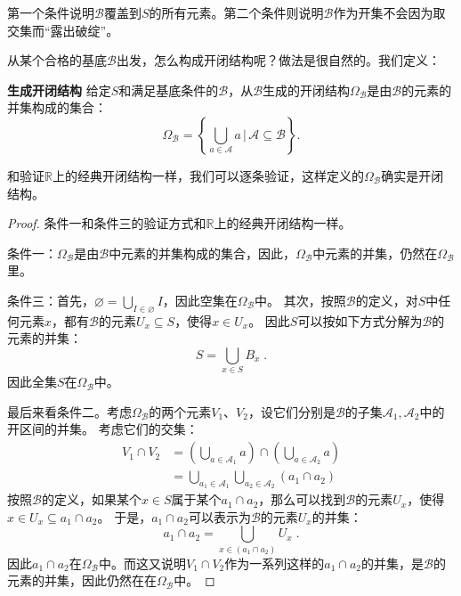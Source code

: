 \documentclass[12pt,UTF8]{ctexbook}
\begin{document}
\begin{appendix}
第一个条件说明$\mathcal{B}$覆盖到$S$的所有元素。第二个条件则说明$\mathcal{B}$作为开集不会因为取交集而“露出破绽”。

从某个合格的基底$\mathcal{B}$出发，怎么构成开闭结构呢？做法是很自然的。我们定义：
\begin{df}{\textbf{生成开闭结构}}
    给定$S$和满足基底条件的$\mathcal{B}$，从$\mathcal{B}$生成的开闭结构$\Omega_{\mathcal{B}}$是由$\mathcal{B}$的元素的并集构成的集合：
    $$ \Omega_{\mathcal{B}} =\left\{\bigcup_{a \in \mathcal{A}} a \, \Bigg| \,\mathcal{A} \subseteq  \mathcal{B} \right\}.  $$
\end{df}

和验证$\mathbb{R}$上的经典开闭结构一样，我们可以逐条验证，这样定义的$\Omega_{\mathcal{B}}$确实是开闭结构。

\begin{proof}
    条件一和条件三的验证方式和$\mathbb{R}$上的经典开闭结构一样。

    条件一：$\Omega_{\mathcal{B}}$是由$\mathcal{B}$中元素的并集构成的集合，因此，$\Omega_{\mathcal{B}}$中元素的并集，仍然在$\Omega_{\mathcal{B}}$里。

    条件三：首先，$\varnothing = \bigcup_{I \in \varnothing} I $，因此空集在$\Omega_{\mathcal{B}}$中。
    其次，按照$\mathcal{B}$的定义，对$S$中任何元素$x$，都有$\mathcal{B}$的元素$U_x\subseteq S$，使得$x\in U_x$。
    因此$S$可以按如下方式分解为$\mathcal{B}$的元素的并集：
    $$ S = \bigcup_{x\in S} B_x \;. $$
    因此全集$S$在$\Omega_{\mathcal{B}}$中。

    最后来看条件二。考虑$\Omega_{\mathcal{B}}$的两个元素$V_1$、$V_2$，设它们分别是$\mathcal{B}$的子集$\mathcal{A}_1, \mathcal{A}_2$中的开区间的并集。
    考虑它们的交集：
    \begin{align*}
        V_1\cap V_2 &= \left(\bigcup_{a \in \mathcal{A}_1} a\right) \cap \left(\bigcup_{a \in \mathcal{A}_2} a\right) \\
        &= \bigcup_{a_1 \in \mathcal{A}_1} \bigcup_{a_2 \in \mathcal{A}_2} (a_1 \cap a_2)   
    \end{align*}
    按照$\mathcal{B}$的定义，如果某个$x\in S$属于某个$a_1 \cap a_2$，那么可以找到$\mathcal{B}$的元素$U_x$，使得$x\in U_x \subseteq a_1\cap a_2$。
    于是，$a_1 \cap a_2$可以表示为$\mathcal{B}$的元素$U_x$的并集：
    $$ a_1 \cap a_2 = \bigcup_{x\in (a_1 \cap a_2)} U_x \;. $$
    因此$a_1 \cap a_2$在$\Omega_{\mathcal{B}}$中。而这又说明$V_1\cap V_2$作为一系列这样的$a_1 \cap a_2$的并集，是$\mathcal{B}$的元素的并集，因此仍然在在$\Omega_{\mathcal{B}}$中。

\end{proof}


\end{appendix}
\end{document}
